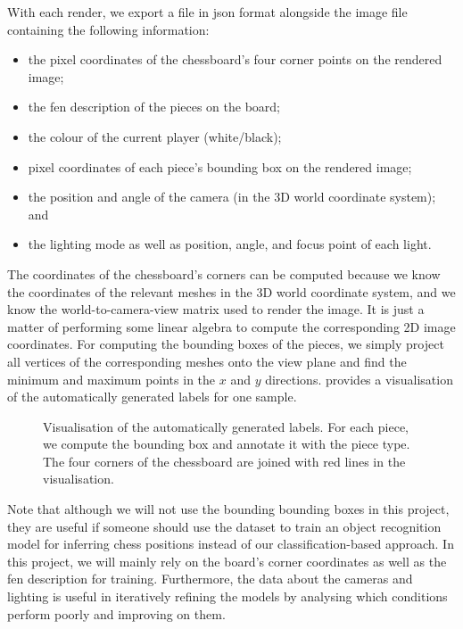 \documentclass[../main.tex]{subfiles}
\begin{document}
With each render, we export a file in \gls{json} format alongside the image file containing the following information:
\begin{itemize}
    \item the pixel coordinates of the chessboard's four corner points on the rendered image;
    \item the \gls{fen} description of the pieces on the board;
    \item the colour of the current player (white/black);
    \item pixel coordinates of each piece's bounding box on the rendered image;
    \item the position and angle of the camera (in the 3D world coordinate system); and
    \item the lighting mode as well as position, angle, and focus point of each light.
\end{itemize}
The coordinates of the chessboard's corners can be computed because we know the coordinates of the relevant meshes in the 3D world coordinate system, and we know the world-to-camera-view matrix used to render the image.
It is just a matter of performing some linear algebra to compute the corresponding 2D image coordinates.
For computing the bounding boxes of the pieces, we simply project all vertices of the corresponding meshes onto the view plane and find the minimum and maximum points in the $x$ and $y$ directions.
 provides a visualisation of the automatically generated labels for one sample.
\begin{figure}
    \caption[Visualisation of the automatically generated labels.]{Visualisation of the automatically generated labels. For each piece, we compute the bounding box and annotate it with the piece type. The four corners of the chessboard are joined with red lines in the visualisation.}
    \label{fig:data_synthesis_visualisation}
\end{figure}
Note that although we will not use the bounding bounding boxes in this project, they are useful if someone should use the dataset to train an object recognition model for inferring chess positions instead of our classification-based approach.
In this project, we will mainly rely on the board's corner coordinates as well as the \gls{fen} description for training.
Furthermore, the data about the cameras and lighting is useful in iteratively refining the models by analysing which conditions perform poorly and improving on them.
\end{document}
